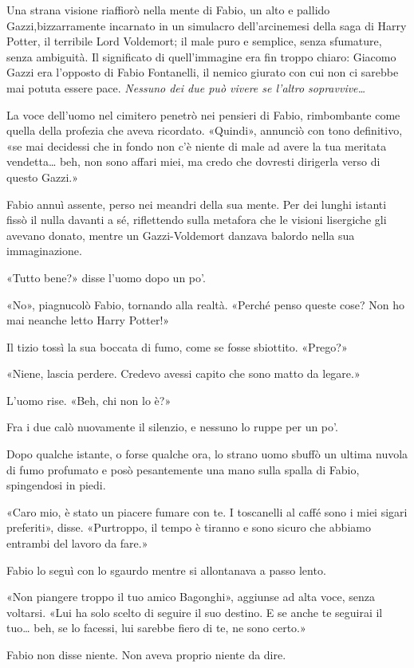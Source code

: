 Una strana visione riaffiorò nella mente di Fabio, un alto e pallido
Gazzi,bizzarramente incarnato in un simulacro dell'arcinemesi della saga
di Harry Potter, il terribile Lord Voldemort; il male puro e semplice,
senza sfumature, senza ambiguità. Il significato di quell'immagine era
fin troppo chiaro: Giacomo Gazzi era l'opposto di Fabio Fontanelli, il
nemico giurato con cui non ci sarebbe mai potuta essere pace.
\emph{Nessuno dei due può vivere se l'altro sopravvive\ldots{}}

La voce dell'uomo nel cimitero penetrò nei pensieri di Fabio,
rimbombante come quella della profezia che aveva ricordato. «Quindi»,
annunciò con tono definitivo, «se mai decidessi che in fondo non c'è
niente di male ad avere la tua meritata vendetta\ldots{} beh, non sono
affari miei, ma credo che dovresti dirigerla verso di questo Gazzi.»

Fabio annuì assente, perso nei meandri della sua mente. Per dei lunghi
istanti fissò il nulla davanti a sé, riflettendo sulla metafora che le
visioni lisergiche gli avevano donato, mentre un Gazzi-Voldemort danzava
balordo nella sua immaginazione.

«Tutto bene?» disse l'uomo dopo un po'.

«No», piagnucolò Fabio, tornando alla realtà. «Perché penso queste cose?
Non ho mai neanche letto Harry Potter!»

Il tizio tossì la sua boccata di fumo, come se fosse sbiottito. «Prego?»

«Niene, lascia perdere. Credevo avessi capito che sono matto da legare.»

L'uomo rise. «Beh, chi non lo è?»

Fra i due calò nuovamente il silenzio, e nessuno lo ruppe per un po'.

Dopo qualche istante, o forse qualche ora, lo strano uomo sbuffò un
ultima nuvola di fumo profumato e posò pesantemente una mano sulla
spalla di Fabio, spingendosi in piedi.

«Caro mio, è stato un piacere fumare con te. I toscanelli al caffé sono
i miei sigari preferiti», disse. «Purtroppo, il tempo è tiranno e sono
sicuro che abbiamo entrambi del lavoro da fare.»

Fabio lo seguì con lo sgaurdo mentre si allontanava a passo lento.

«Non piangere troppo il tuo amico Bagonghi», aggiunse ad alta voce,
senza voltarsi. «Lui ha solo scelto di seguire il suo destino. E se
anche te seguirai il tuo\ldots{} beh, se lo facessi, lui sarebbe fiero
di te, ne sono certo.»

Fabio non disse niente. Non aveva proprio niente da dire.
